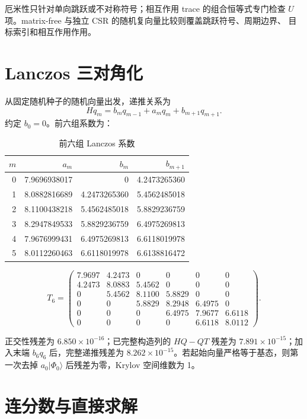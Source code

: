 \documentclass[UTF8,a4paper,11pt,fontset=windows]{ctexart}
\begin{document}
厄米性只针对单向跳跃或不对称符号；相互作用 trace 的组合恒等式专门检查
$U$ 项。matrix-free 与独立 CSR 的随机复向量比较则覆盖跳跃符号、周期边界、
目标索引和相互作用作用。

\section{Lanczos 三对角化}

从固定随机种子的随机向量出发，递推关系为
\begin{equation}
Hq_m=b_mq_{m-1}+a_mq_m+b_{m+1}q_{m+1}.
\end{equation}
约定 $b_0=0$。前六组系数为：

\begin{table}[H]
\centering
\caption{前六组 Lanczos 系数}
\begin{tabular}{rrrr}
\toprule
$m$ & $a_m$ & $b_m$ & $b_{m+1}$ \\
\midrule
0 & 7.9696938017 & 0 & 4.2473265360 \\
1 & 8.0882816689 & 4.2473265360 & 5.4562485018 \\
2 & 8.1100438218 & 5.4562485018 & 5.8829236759 \\
3 & 8.2947849533 & 5.8829236759 & 6.4975269813 \\
4 & 7.9676999431 & 6.4975269813 & 6.6118019978 \\
5 & 8.0112260463 & 6.6118019978 & 6.6138816472 \\
\bottomrule
\end{tabular}
\end{table}

\begin{equation}
T_6=\begin{pmatrix}
7.9697&4.2473&0&0&0&0\\
4.2473&8.0883&5.4562&0&0&0\\
0&5.4562&8.1100&5.8829&0&0\\
0&0&5.8829&8.2948&6.4975&0\\
0&0&0&6.4975&7.9677&6.6118\\
0&0&0&0&6.6118&8.0112
\end{pmatrix}.
\end{equation}

正交性残差为 $6.850\times10^{-16}$；已完整构造列的 $HQ-QT$ 残差为
$7.891\times10^{-15}$；加入末端 $b_6q_6$ 后，完整递推残差为
$8.262\times10^{-15}$。若起始向量严格等于基态，则第一次去掉
$a_0\lvert\Phi_0\rangle$ 后残差为零，Krylov 空间维数为 1。

\section{连分数与直接求解}
\end{document}
